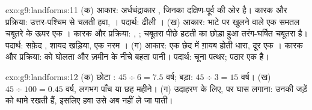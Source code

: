 \begin{solution}{exo:g9:landforms:11}
(क) आकार: अर्धचंद्राकार , जिनका  दक्षिण-पूर्व की ओर है।
कारक और प्रक्रिया: उत्तर-पश्चिम से चलती हवा, ।
पदार्थ: ढीली । (ख) आकार: भाटे पर खुलने वाले एक समतल चबूतरे के ऊपर एक ।
कारक और प्रक्रिया: , ; चबूतरा पीछे हटती  का छोड़ा हुआ तरंग-घर्षित
चबूतरा है। पदार्थ: सफ़ेद , शायद खड़िया, एक नरम । (ग) आकार: एक छेद में
ग़ायब होती धारा, दूर एक । कारक और प्रक्रिया:  को घोलता और ज़मीन के नीचे
बहता पानी। पदार्थ: चूना पत्थर; पठार एक  है।
\end{solution}

\begin{solution}{exo:g9:landforms:12}
(क) छोटा : $45 \div 6 = 7.5$ वर्ष; बड़ा: $45 \div 3 =
15$ वर्ष। (ख) $45 \div 100 = 0.45$ वर्ष, लगभग पाँच या छह महीने।
(ग) उदाहरण के लिए,  पर घास लगाना: उनकी जड़ें  को थामे रखती हैं, इसलिए
हवा उसे अब नहीं ले जा पाती।
\end{solution}

